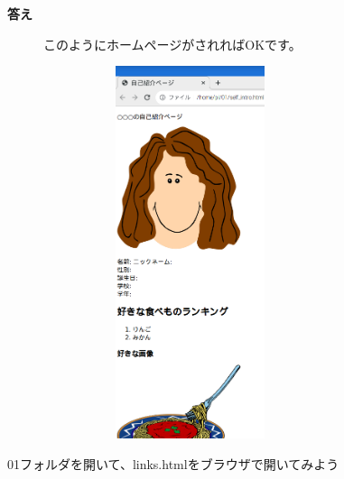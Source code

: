 \documentclass[a4paper,12pt]{jarticle}
\begin{document}
\bigskip

\clearpage
\textbf{答え}



\begin{figure}[hb]
  \centering
  \begin{minipage}{16.574cm}
    このようにホームページがされればOKです。

    \centering
    \includegraphics[width=8.588cm,height=10.933cm]{textbook-img142.png}
  \end{minipage}

\end{figure}
\theQuestion\label{Q:hasAnswer04-1}

01フォルダを開いて、links.htmlをブラウザで開いてみよう


\bigskip

\vfill
\end{document}

